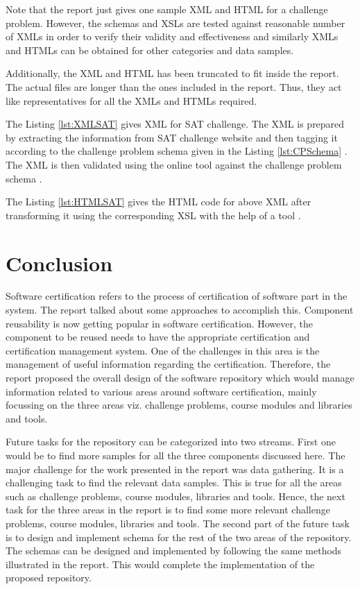 \documentclass[11pt,letterpaper]{report}
\begin{document}
Note that the report just gives one sample XML and HTML for a challenge problem. However, the schemas and XSLs are tested against reasonable number of XMLs in order to verify their validity and effectiveness and similarly XMLs and HTMLs can be obtained for other categories and data samples.

Additionally, the XML and HTML has been truncated to fit inside the report. The actual files are longer than the ones included in the report. Thus, they act like representatives for all the XMLs and HTMLs required.

The Listing \ref{lst:XMLSAT} gives XML for SAT challenge. The XML is prepared by extracting the information from SAT challenge website and then tagging it according to the challenge problem schema given in the Listing \ref{lst:CPSchema} \cite{SAT}. The XML is then validated using the online tool against the challenge problem schema \cite{olXSD}. 



\bigskip
The Listing \ref{lst:HTMLSAT} gives the HTML code for above XML after transforming it using the corresponding XSL with the help of a tool \cite{olXSL}.



\chapter{Conclusion}
Software certification refers to the process of certification of software part in the system. The report talked about some approaches to accomplish this. Component reusability is now getting popular in software certification. However, the component to be reused needs to have the appropriate certification and certification management system. One of the challenges in this area is the management of useful information regarding the certification. Therefore, the report proposed the overall design of the software repository which would manage information related to various areas around software certification, mainly focussing on the three areas viz. challenge problems, course modules and libraries and tools. 

Future tasks for the repository can be categorized into two streams. First one would be to find more samples for all the three components discussed here. The major challenge for the work presented in the report was data gathering. It is a challenging task to find the relevant data samples. This is true for all the areas such as challenge problems, course modules, libraries and tools. Hence, the next task for the three areas in the report is to find some more relevant challenge problems, course modules, libraries and tools. The second part of the future task is to design and implement schema for the rest of the two areas of the repository. The schemas can be designed and implemented by following the same methods illustrated in the report. This would complete the implementation of the proposed repository. 
\end{document}
